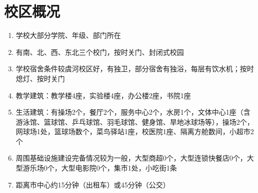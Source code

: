 \section*{校区概况}
\begin{enumerate}
    \item 学校大部分学院、年级、部门所在
    \item 有南、北、西、东北三个校门，按时关门、封闭式校园\footnotemark
    \item 学校宿舍条件较虞河校区好，有独卫，部分宿舍有独浴，每层有饮水机；按时熄灯、按时关门
    \item 教学建筑：教学楼4座，实验楼4座，办公楼2座，书院1座
    \item 生活建筑：有操场2个，餐厅2个，服务中心2个，水房1个，文体中心1座（含游泳馆、篮球馆、乒乓球馆、羽毛球馆、健身馆、旱地冰球场等），操场2个，网球场1处，篮球场数个，菜鸟驿站1座，校医院1座、隔离方舱数间，小超市2个
    \item 周围基础设施建设完备情况较为一般，大型商超0个，大型连锁快餐店0个，大型游乐场0个，大型电影院0个，集市1处，小吃街1条
    \item 距离市中心约15分钟（出租车）或45分钟（公交）
\end{enumerate}

